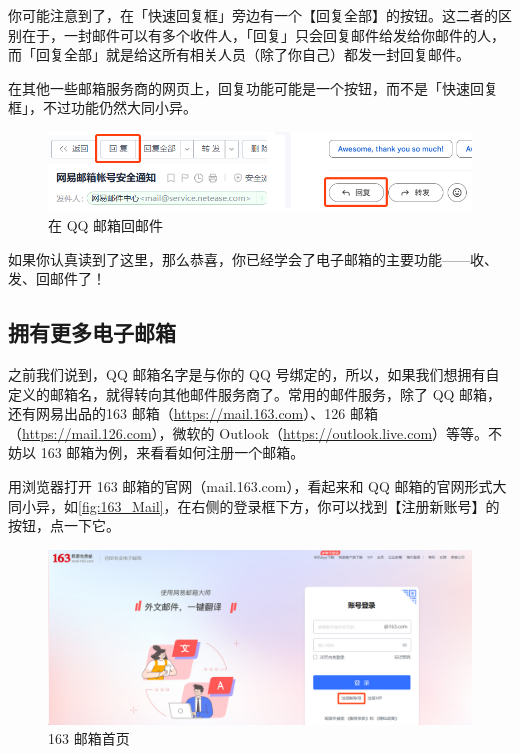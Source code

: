 \begin{note}
  你可能注意到了，在「快速回复框」旁边有一个【回复全部】的按钮。这二者的区别在于，一封邮件可以有多个收件人，「回复」只会回复邮件给发给你邮件的人，而「回复全部」就是给这所有相关人员（除了你自己）都发一封回复邮件。
\end{note}

在其他一些邮箱服务商的网页上，回复功能可能是一个按钮，而不是「快速回复框」，不过功能仍然大同小异。

\begin{figure}[htb!]
  \centering
  \includegraphics[width=.7\textwidth]{assets/software/Reply_Buttons.png}
  \caption{在 QQ 邮箱回邮件}
  \label{fig:Reply_Buttons}
\end{figure}

如果你认真读到了这里，那么恭喜，你已经学会了电子邮箱的主要功能——收、发、回邮件了！

\subsection{拥有更多电子邮箱}

之前我们说到，QQ 邮箱名字是与你的 QQ 号绑定的，所以，如果我们想拥有自定义的邮箱名，就得转向其他邮件服务商了。常用的邮件服务，除了 QQ 邮箱，还有网易出品的163 邮箱（\url{https://mail.163.com}）、126 邮箱（\url{https://mail.126.com}），微软的 Outlook（\url{https://outlook.live.com}）等等。不妨以 163 邮箱为例，来看看如何注册一个邮箱。

用浏览器打开 163 邮箱的官网（mail.163.com），看起来和 QQ 邮箱的官网形式大同小异，如\autoref{fig:163_Mail}，在右侧的登录框下方，你可以找到【注册新账号】的按钮，点一下它。

\begin{figure}[htb!]
  \centering
  \includegraphics[width=.7\textwidth]{assets/software/163_Mail.png}
  \caption{163 邮箱首页}
  \label{fig:163_Mail}
\end{figure}

